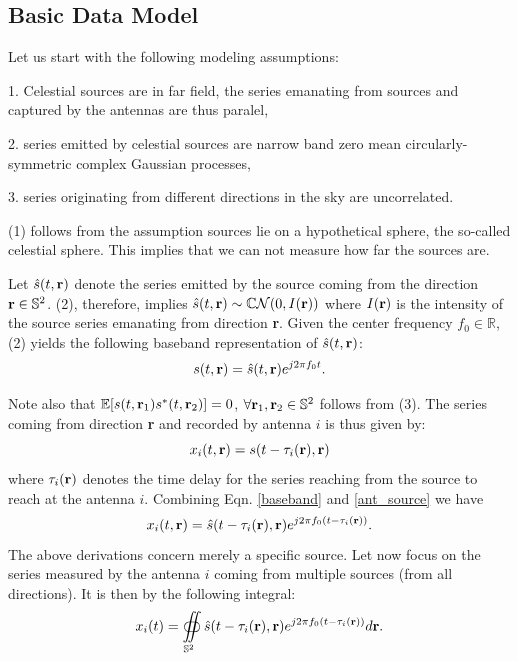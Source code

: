 \documentclass{article}
\begin{document}
\subsection{Basic Data Model}

Let us start with the following modeling assumptions:~\cite{perley}

1. Celestial sources are in far field, the series emanating from sources and captured by the antennas are thus paralel,
  
2.  series emitted by celestial sources are narrow band zero mean circularly-symmetric complex Gaussian processes,
    
3.  series originating from different directions in the sky are uncorrelated.  
  
(1) follows from the assumption sources lie on a hypothetical sphere, the so-called celestial sphere. This implies that we can not measure how far the sources are.
 \vspace{3mm}
 
Let $\hat{s}(t,{\bf r})$ denote the series emitted by the source coming from the direction ${\bf r} \in \mathbb{S}^2$. (2), therefore, implies $\hat{s}(t,{\bf r}) \sim \mathbb{C}\mathcal{N}(0,I(\bf{r}))$ where $I(\bf{r})$ is the intensity of the source series emanating from direction {\bf r}. Given the center frequency $f_0 \in \mathbb{R}$, (2) yields the following baseband representation of $\hat{s}(t,{\bf r})$:
\begin{equation}
 s(t,{\bf r}) = \hat{s}(t,{\bf r})e^{j2\pi f_0t}.\label{baseband}
 \end{equation}
 
Note also that $\mathbb{E}[s(t,{\bf r}_1)s^*(t,{\bf r}_2)] =0$, $\forall {\bf r}_1, {\bf r}_2 \in \mathbb{S}^2$ follows from (3). 
The series coming from direction {\bf r} and recorded by antenna $i$ is thus given by:
\begin{equation}
x_i(t,{\bf r}) = s(t-\tau_{i}({\bf r}),{\bf r}) \label{ant_source}
\end{equation} 
 where $\tau_i({\bf r})$ denotes the time delay for the series reaching from the source to reach at the antenna $i$. Combining Eqn. \ref{baseband} and \ref{ant_source} we have
 \begin{equation}
 x_i(t,{\bf r}) = \hat{s}(t-\tau_{i}({\bf r}),{\bf r})e^{j2\pi f_0(t-\tau_{i}({\bf r}))}.
 \end{equation}
The above derivations concern merely a specific source. Let now focus on the series measured by the antenna $i$ coming from multiple sources (from all directions). It is then by the following integral:
\begin{equation}
x_i(t) = \oiint \displaylimits_{\mathbb{S}^2} \hat{s}(t-\tau_i({\bf r}), {\bf r})e^{j2\pi f_0(t-\tau_i({\bf r}))}d{\bf r}. \label{int_sour}
\end{equation}
 
\end{document}
